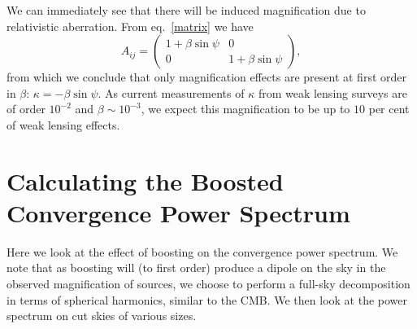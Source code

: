 \documentclass[useAMS,fleqn, usenatbib]{mn2e}
\begin{document}
We can immediately see  that there will be induced magnification due
to relativistic aberration. From eq.~\ref{matrix} we have
\begin{equation}
A_{ij} = \left(\begin{array}{cc}
1+\beta\sin\psi & 0\\
0 & 1+\beta\sin\psi
\end{array}\right),
\end{equation}
from which we conclude that only magnification effects are present
at first order in $\beta$: $\kappa = -\beta\sin\psi$. As current measurements of
$\kappa$ from weak lensing surveys are of order $10^{-2}$ and $\beta\sim10^{-3}$,
we expect this magnification to be up to $10$ per cent of weak lensing effects.


\section{Calculating the Boosted Convergence Power Spectrum}
\label{powerspectrum}
Here we look at the effect of boosting on the convergence power spectrum.
We note that as boosting will (to first order) produce a dipole on
the sky in the observed magnification of sources, we choose to perform
a full-sky decomposition in terms of spherical harmonics, similar
to the CMB. We then look at the power spectrum on cut skies of various
sizes.
\end{document}
